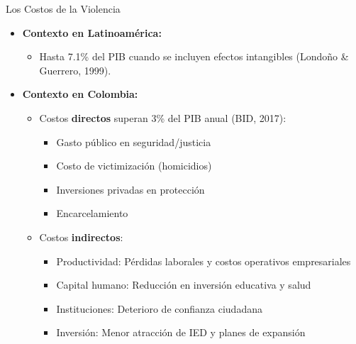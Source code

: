 \begin{frame}{Los Costos de la Violencia}
    \begin{itemize}
        \item \textbf{Contexto en Latinoamérica:} 
        \begin{itemize}
            \item Hasta \alert{7.1\% del PIB} cuando se incluyen efectos intangibles (Londoño \& Guerrero, 1999).
        \end{itemize}
        
        \vspace{0.1cm}
        \pause
        \item \textbf{Contexto en Colombia:}
        \begin{itemize}
        \pause
            \item Costos \textbf{directos} superan \alert{3\% del PIB anual} (BID, 2017):
            \begin{itemize}
                \scriptsize
                \item Gasto público en seguridad/justicia
                \item Costo de victimización (homicidios)
                \item Inversiones privadas en protección
                \item Encarcelamiento
            \end{itemize}
        \pause
            \item Costos \textbf{indirectos}: %
            \begin{itemize}
                \item \alert{Productividad}: Pérdidas laborales y costos operativos empresariales
                \item \alert{Capital humano}: Reducción en inversión educativa y salud
                \item \alert{Instituciones}: Deterioro de confianza ciudadana
                \item \alert{Inversión}: Menor atracción de IED y planes de expansión
            \end{itemize}
        \end{itemize}
        
        
    \end{itemize}
\end{frame}